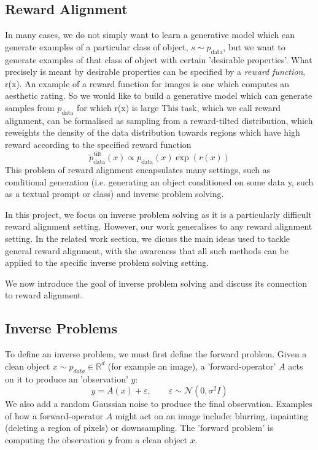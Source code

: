 \documentclass[12pt,a4paper]{report}
\begin{document}
\subsection{Reward Alignment}
In many cases, we do not simply want to learn a generative model which can generate examples of a particular class of object, $s \sim p_\text{data}$, but we want to generate examples of that class of object with certain 'desirable properties'. 
What precisely is meant by desirable properties can be specified by a \emph{reward function}, r(x). 
An example of a reward function for images is one which computes an aesthetic rating. 
So we would like to build a generative model which can generate samples from $p_\text{data}$ for which r(x) is large
This task, which we call reward alignment, can be formalised as sampling from a reward-tilted distribution, which reweights the density of the data distribution towards regions which have high reward according to the specified reward function
\begin{equation}
    \label{eq:reward_tilted_probability_path}
    \widetilde{p}_{\text{data}}^{\text{tilt}}(x) \propto p_{\text{data}}(x) \exp (r(x))
\end{equation}
This problem of reward alignment encapsulates many settings, such as conditional generation (i.e. generating an object conditioned on some data y, such as a textual prompt or class) and inverse problem solving. 

In this project, we focus on inverse problem solving as it is a particularly difficult reward alignment setting. However, our work generalises to any reward alignment setting. 
In the related work section, we dicuss the main ideas used to tackle general reward alignment, with the awareness that all such methods can be applied to the specific inverse problem solving setting. 

We now introduce the goal of inverse problem solving and discuss its connection to reward alignment. 

\subsection{Inverse Problems}
To define an inverse problem, we must first define the forward problem. 
Given a clean object $x \sim p_{data} \in \mathbb{R}^d$  (for example an image), 
 a 'forward-operator' $A$ acts on it to produce an 'observation' $y$:
\[ y = A(x) + \varepsilon, \qquad \varepsilon \sim \mathcal{N}(0, \sigma^2 I) \]
We also add a random Gaussian noise to produce the final observation.
Examples of how a forward-operator $A$ might act on an image include: blurring, inpainting (deleting a region of pixels) or downsampling. 
The 'forward problem' is computing the observation $y$ from a clean object $x$. 
\end{document}
